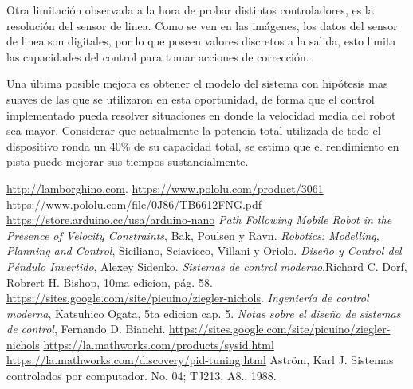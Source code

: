 \documentclass[10pt,conference,a4paper,onecolumn]{article}%
\begin{document}
Otra limitación observada a la hora de probar distintos controladores, es la resolución del sensor de linea. Como se ven en las imágenes, los datos del sensor de linea son digitales, por lo que poseen valores discretos a la salida, esto limita las capacidades del control para tomar acciones de corrección.

Una última posible mejora es obtener el modelo del sistema con hipótesis mas suaves de las que se utilizaron en esta oportunidad, de forma que el control implementado pueda resolver situaciones en donde la velocidad media del robot sea mayor. Considerar que actualmente la potencia total utilizada de todo el dispositivo ronda un $40\%$ de su capacidad total, se estima que el rendimiento en pista puede mejorar sus tiempos sustancialmente.   
\begin{thebibliography}{X}
 \url{http://lamborghino.com}. 
\url{https://www.pololu.com/product/3061}
\url{ https://www.pololu.com/file/0J86/TB6612FNG.pdf}
 \url{https://store.arduino.cc/usa/arduino-nano}
 \textit{Path Following Mobile Robot in the Presence of Velocity Constraints}, Bak, Poulsen y Ravn.
 \textit{Robotics: Modelling, Planning and Control}, Siciliano, Sciavicco, Villani y Oriolo.
 \textit{Diseño y Control del Péndulo Invertido}, Alexey Sidenko.
 \textit{Sistemas de control moderno},Richard C. Dorf, Robrert H. Bishop, 10ma edicion, pág. 58.
 \url{https://sites.google.com/site/picuino/ziegler-nichols}.
 \textit{Ingeniería de control moderna}, Katsuhico Ogata, 5ta edicion cap. 5.
 \textit{Notas sobre el diseño de sistemas de control}, Fernando D. Bianchi.
\url{https://sites.google.com/site/picuino/ziegler-nichols}
\url{https://la.mathworks.com/products/sysid.html}
\url{https://la.mathworks.com/discovery/pid-tuning.html}
 Aström, Karl J. Sistemas controlados por computador. No. 04; TJ213, A8.. 1988.
\end{thebibliography}
\end{document}
